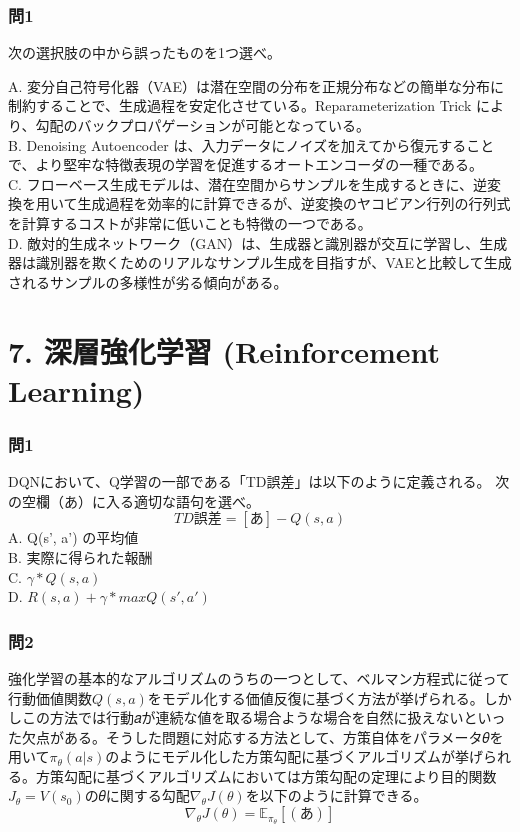 \documentclass[
  letterpaper,
  DIV=11,
  numbers=noendperiod]{scrreprt}
\begin{document}
\subsection{問1}\label{ux554f1-4}

次の選択肢の中から誤ったものを1つ選べ。

A.
変分自己符号化器（VAE）は潜在空間の分布を正規分布などの簡単な分布に制約することで、生成過程を安定化させている。Reparameterization
Trick により、勾配のバックプロパゲーションが可能となっている。\\
B. Denoising Autoencoder
は、入力データにノイズを加えてから復元することで、より堅牢な特徴表現の学習を促進するオートエンコーダの一種である。\\
C.
フローベース生成モデルは、潜在空間からサンプルを生成するときに、逆変換を用いて生成過程を効率的に計算できるが、逆変換のヤコビアン行列の行列式を計算するコストが非常に低いことも特徴の一つである。\\
D.
敵対的生成ネットワーク（GAN）は、生成器と識別器が交互に学習し、生成器は識別器を欺くためのリアルなサンプル生成を目指すが、VAEと比較して生成されるサンプルの多様性が劣る傾向がある。

\chapter{7. 深層強化学習 (Reinforcement
Learning)}\label{ux6df1ux5c64ux5f37ux5316ux5b66ux7fd2-reinforcement-learning}

\subsection{問1}\label{ux554f1-5}

DQNにおいて、Q学習の一部である「TD誤差」は以下のように定義される。
次の空欄（あ）に入る適切な語句を選べ。 \[
TD誤差 = [あ] − Q(s, a)
\] A. Q(s', a') の平均値\\
B. 実際に得られた報酬\\
C. \({γ * Q(s, a)}\)\\
D. \({R(s, a) + γ * maxQ(s', a')}\)

\subsection{問2}\label{ux554f2-3}

強化学習の基本的なアルゴリズムのうちの一つとして、ベルマン方程式に従って行動価値関数\(𝑄(𝑠, 𝑎)\)をモデル化する価値反復に基づく方法が挙げられる。しかしこの方法では行動𝑎が連続な値を取る場合ような場合を自然に扱えないといった欠点がある。そうした問題に対応する方法として、方策自体をパラメータ𝜃を用いて\(𝜋_𝜃(𝑎|𝑠)\)のようにモデル化した方策勾配に基づくアルゴリズムが挙げられる。方策勾配に基づくアルゴリズムにおいては方策勾配の定理により目的関数\(𝐽_𝜃 = 𝑉(𝑠_0)\)の𝜃に関する勾配\(∇_𝜃𝐽(𝜃)\)を以下のように計算できる。
\[
∇_𝜃𝐽(𝜃) = 𝔼_{𝜋_𝜃}[(あ)]
\]
\end{document}

